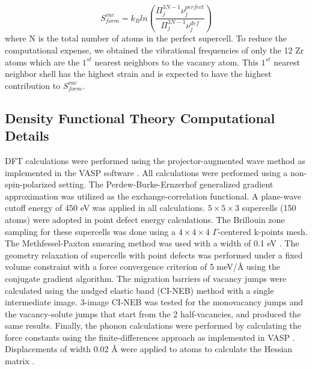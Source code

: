 \documentclass[preprint,12pt]{elsarticle}
\providecommand{\DIFadd}[1]{{\bf #1}} %
\providecommand{\DIFdel}[1]{} %
\providecommand{\DIFaddbegin}{\protect\color{blue}} %
\providecommand{\DIFaddend}{\protect\color{black}} %
\providecommand{\DIFdelbegin}{\protect\color{red}} %
\providecommand{\DIFdelend}{\protect\color{black}} %
\newcommand{\DIFscaledelfig}{0.5}
\newlength{\DIFdelgraphicswidth} %
\newlength{\DIFdelgraphicsheight} %
\newcommand{\DIFaddincludegraphics}[2][]{{\color{blue}\fbox{\DIFOincludegraphics[#1]{#2}}}} %
\newcommand{\DIFdelincludegraphics}[2][]{%
\sbox{\DIFdelgraphicsbox}{\DIFOincludegraphics[#1]{#2}}%
\settoboxwidth{\DIFdelgraphicswidth}{\DIFdelgraphicsbox} %
\settoboxtotalheight{\DIFdelgraphicsheight}{\DIFdelgraphicsbox} %
\scalebox{\DIFscaledelfig}{%
\parbox[b]{\DIFdelgraphicswidth}{\usebox{\DIFdelgraphicsbox}\\[-\baselineskip] \rule{\DIFdelgraphicswidth}{0em}}\llap{\resizebox{\DIFdelgraphicswidth}{\DIFdelgraphicsheight}{%
\setlength{\unitlength}{\DIFdelgraphicswidth}%
\begin{picture}(1,1)%
\thicklines\linethickness{2pt} %
{\color[rgb]{1,0,0}\put(0,0){\framebox(1,1){}}}%
{\color[rgb]{1,0,0}\put(0,0){\line( 1,1){1}}}%
{\color[rgb]{1,0,0}\put(0,1){\line(1,-1){1}}}%
\end{picture}%
}\hspace*{3pt}}} %
} %
\DeclareRobustCommand{\DIFaddbegin}{\DIFOaddbegin \let\includegraphics\DIFaddincludegraphics} %
\DeclareRobustCommand{\DIFaddend}{\DIFOaddend \let\includegraphics\DIFOincludegraphics} %
\DeclareRobustCommand{\DIFdelbegin}{\DIFOdelbegin \let\includegraphics\DIFdelincludegraphics} %
\DeclareRobustCommand{\DIFdelend}{\DIFOaddend \let\includegraphics\DIFOincludegraphics} %
\begin{document}
\begin{equation}
    S_{form}^{vac} = k_B ln(\frac{\Pi^{3N-1}_j \nu_j^{perfect}}{\Pi^{3N-1}_j \nu_j^{def}})
\end{equation}
where N is the total number of atoms in the perfect supercell. To reduce the computational expense, we obtained the vibrational frequencies of only the 12 Zr atoms which are the $1^{st}$ nearest neighbors to the vacancy atom. This $1^{st}$ nearest neighbor shell has the highest strain and is expected to have the highest contribution to $S_{form}^{vac}$. \DIFaddbegin \DIFadd{Similar to the approximation used in calculating the attempt frequencies, the approximation used for the vacancy formation entropy is expected to introduce a minor error that will not impact any qualitative conclusions in this work.
}\DIFaddend 

\FloatBarrier

\subsection{Density Functional Theory Computational Details}

DFT calculations were performed using the projector-augmented wave method \cite{blochl_projector_1994} as implemented in the VASP software \cite{kresse_ab_1993, kresse_efficient_1996}. All calculations were performed using a non-spin-polarized setting. The Perdew-Burke-Ernzerhof generalized gradient approximation \cite{perdew_generalized_1996} was utilized as the exchange-correlation functional. A plane-wave cutoff energy of 450 eV was applied in all calculations. $5\times5\times3$ supercells (150 atoms) were adopted in point defect energy calculations. The Brillouin zone sampling for these supercells was done using a $4\times4\times4$ $\Gamma$-centered k-points mesh. The Methfessel-Paxton smearing method was used with a width of 0.1 eV  \cite{methfessel_high-precision_1989}. The geometry relaxation of supercells with point defects was performed under a fixed volume constraint with a force convergence criterion of 5 meV/{\AA} using the conjugate gradient algorithm. The migration barriers of vacancy jumps were calculated using the \DIFdelbegin \DIFdel{climbing-image }\DIFdelend \DIFaddbegin \DIFadd{climbing image }\DIFaddend nudged elastic band (CI-NEB) method \cite{henkelman_climbing_2000} with a single intermediate image. 3-image CI-NEB was tested for the monovacancy jumps and the vacancy-solute jumps that start from the 2 half-vacancies, and produced the same results. Finally, the phonon calculations were performed by calculating the force constants using the finite-differences approach as implemented in VASP \cite{kresse_ab_1993,kresse_efficient_1996}. Displacements of width 0.02 {\AA} were applied to atoms to calculate the Hessian matrix \cite{hafner_ab-initio_2008}.
\end{document}
